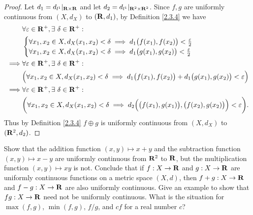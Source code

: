 \begin{proof}
    Let \(d_1 = d_{l^1}|_{\mathbf{R} \times \mathbf{R}}\) and let \(d_2 = d_{l^1}|_{\mathbf{R}^2 \times \mathbf{R}^2}\).
    Since \(f, g\) are uniformly continuous from \((X, d_X)\) to \((\mathbf{R}, d_1)\), by Definition \ref{2.3.4} we have
    \begin{align*}
                 & \forall \varepsilon \in \mathbf{R}^+, \exists\ \delta \in \mathbf{R}^+ :                                                                                           \\
                 & \begin{cases}
                       \forall x_1, x_2 \in X, d_X(x_1, x_2) < \delta \implies d_1\big(f(x_1), f(x_2)\big) < \frac{\varepsilon}{2} \\
                       \forall x_1, x_2 \in X, d_X(x_1, x_2) < \delta \implies d_1\big(g(x_1), g(x_2)\big) < \frac{\varepsilon}{2}
                   \end{cases}                                        \\
        \implies & \forall \varepsilon \in \mathbf{R}^+, \exists\ \delta \in \mathbf{R}^+ :                                                                                           \\
                 & \Big(\forall x_1, x_2 \in X, d_X(x_1, x_2) < \delta \implies d_1\big(f(x_1), f(x_2)\big) + d_1\big(g(x_1), g(x_2)\big) < \varepsilon\Big)          \\
        \implies & \forall \varepsilon \in \mathbf{R}^+, \exists\ \delta \in \mathbf{R}^+ :                                                                                           \\
                 & \bigg(\forall x_1, x_2 \in X, d_X(x_1, x_2) < \delta \implies d_2\Big(\big(f(x_1), g(x_1)\big), \big(f(x_2), g(x_2)\big)\Big) < \varepsilon\bigg).
    \end{align*}
    Thus by Definition \ref{2.3.4} \(f \oplus g\) is uniformly continuous from \((X, d_X)\) to \((\mathbf{R}^2, d_2)\).
\end{proof}

\begin{exercise}\label{ex 2.3.6}
    Show that the addition function \((x, y) \mapsto x + y\) and the subtraction function \((x, y) \mapsto x - y\) are uniformly continuous from \(\mathbf{R}^2\) to \(\mathbf{R}\), but the multiplication function \((x, y) \mapsto xy\) is not.
    Conclude that if \(f : X \to \mathbf{R}\) and \(g : X \to \mathbf{R}\) are uniformly continuous functions on a metric space \((X, d)\), then \(f + g : X \to \mathbf{R}\) and \(f - g : X \to \mathbf{R}\) are also uniformly continuous.
    Give an example to show that \(fg : X \to \mathbf{R}\) need not be uniformly continuous.
    What is the situation for \(\max(f, g)\), \(\min(f, g)\), \(f / g\), and \(cf\) for a real number \(c\)?
\end{exercise}

